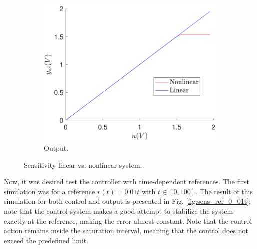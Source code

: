 \begin{figure}
\begin{subfigure}[b]{0.475\textwidth}
            \includegraphics[scale=0.425]{files/heuristic/Sensitivity/sens_lin_vs_nonlin.pdf}
            \caption{Output.}
        \end{subfigure}
        \caption{Sensitivity linear vs. nonlinear system.}
        \label{fig:sens_lin_nonlin}
	\end{figure}
	
    
    Now, it was desired test the controller with time-dependent references. The first simulation was for a reference $r(t)=0.01t$ with $t\in[0,100]$. The result of this simulation for both control and output is presented in Fig. \ref{fig:sens_ref_0_01t}; note that the control system makes a good attempt to stabilize the system exactly at the reference, making the error almost constant. Note that the control action remains inside the saturation interval, meaning that the control does not exceed the predefined limit.
    
